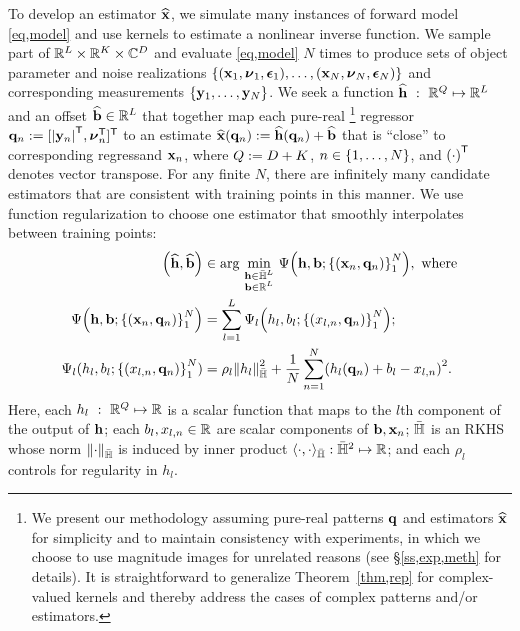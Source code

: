 To develop an estimator $\widehat{\mathbf{x}}$,
we simulate many instances 
of forward model \eqref{eq,model}
and use kernels
to estimate a nonlinear inverse function.
We sample part of $\mathbb{R}^{L} \times \mathbb{R}^{K} \times \mathbb{C}^{D}$
and evaluate \eqref{eq,model} $N$ times
to produce sets of object parameter and noise realizations
$\set{\paren{\bmx_1,\bmnu_1,\bmeps_1},\dots,\paren{\bmx_N,\bmnu_N,\bmeps_N}}$
and corresponding measurements
$\set{\bmy_1,\dots,\bmy_N}$. 
We seek a function
$\widehat{\mathbf{h}}~:~\mathbb{R}^{Q} \mapsto \mathbb{R}^{L}$
and an offset $\widehat{\mathbf{b}} \in \mathbb{R}^{L}$
that together map each pure-real
\footnote{%
	We present our methodology 
	assuming pure-real patterns $\mathbf{q}$ 
	and estimators $\widehat{\mathbf{x}}$
	for simplicity and 
	to maintain consistency
	with experiments,
	in which we choose to use magnitude images
	for unrelated reasons 
	(see \S\ref{ss,exp,meth} for details). 
	It is straightforward 
	to generalize Theorem~\ref{thm,rep}
	for complex-valued kernels 
	and thereby address the cases 
	of complex patterns and/or estimators.
}
regressor $\bmq_n := [\abs{\bmy_n}\tpose, \bmnu_n\tpose]\tpose$
to an estimate 
$\bmxha{\bmq_n} := \bmhha{\bmq_n}+\est{\bmb}$ 
that is ``close'' 
to corresponding regressand $\mathbf{x}_n$,
where $Q := D+K$,
$n \in \set{1,\dots,N}$,
and $\paren{\cdot}\tpose$ denotes vector transpose.
For any finite $N$,
there are infinitely many candidate estimators
that are consistent with training points
in this manner.
We use function regularization
to choose one estimator
that smoothly interpolates 
between training points:
\begin{align}
	\paren{\est{\bmh},\est{\bmb}} &\in 
		\argmin{\substack{\bmh \in \rkhs^L \\ \bmb \in \reals{L}}}
		\costa{\bmh, \bmb; \set{\paren{\bmx_n,\bmq_n}}_{1}^N}, 
		\where \label{eq,prob} \\
	\costa{\bmh, \bmb; \set{\paren{\bmx_n,\bmq_n}}_{1}^N} &= 
		\sum_{l=1}^L \cost_l\paren{h_l,b_l; \set{\paren{x_{l,n},\bmq_n}}_{1}^N}; 
		\label{eq,cost} \\
	\Psi_l(h_l,b_l; \set{\paren{x_{l,n},\bmq_n}}_{1}^N) &= 
		\rho_l \norm{h_l}_\rkhs^2 + 
		\frac{1}{N} \sum_{n=1}^N \paren{h_l(\bmq_n) + b_l - x_{l,n}}^2.
		\label{eq,cost-l}
\end{align}
Here, each $h_l~:~\mathbb{R}^{Q} \mapsto \mathbb{R}$ is a scalar function
that maps to the $l$th component of the output of $\mathbf{h}$; 
each $b_l,x_{l,n} \in \mathbb{R}$ are scalar components of $\mathbf{b},\mathbf{x}_n$;
${\bar{\mathbb{H}}}$ is an RKHS 
whose norm $\norm{\cdot}_\rkhs$ 
is induced by inner product 
$\langle \cdot,\cdot \rangle_{\bar{\mathbb{H}}} : {\bar{\mathbb{H}}}^2 \mapsto \mathbb{R}$; 
and each $\rho_l$ controls for regularity in $h_l$.

